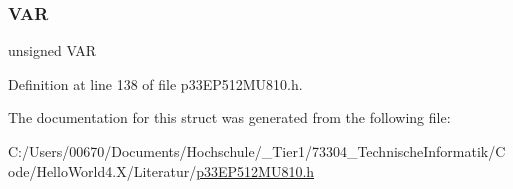 \mbox{\label{structtag_c_o_r_c_o_n_b_i_t_s_a8d1bf34c8ccd632757eb7f9a46156262}} 
\subsubsection{\texorpdfstring{V\+AR}{VAR}}
{\footnotesize\ttfamily unsigned V\+AR}



Definition at line 138 of file p33\+E\+P512\+M\+U810.\+h.



The documentation for this struct was generated from the following file\+:\begin{DoxyCompactItemize}
\item 
C\+:/\+Users/00670/\+Documents/\+Hochschule/\+\_\+\+Tier1/73304\+\_\+\+Technische\+Informatik/\+Code/\+Hello\+World4.\+X/\+Literatur/\hyperlink{p33_e_p512_m_u810_8h}{p33\+E\+P512\+M\+U810.\+h}\end{DoxyCompactItemize}
